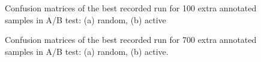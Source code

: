 \begin{figure}[ht!]
    \centering  
    \caption{Confusion matrices of the best recorded run for 100 extra annotated samples in A/B test: (a) random, (b) active}
    \label{c5:figure_cm_100}
\end{figure}

\begin{figure}[ht!]
    \centering  
    \caption{Confusion matrices of the best recorded run for 700 extra annotated samples in A/B test: (a) random, (b) active.}
    \label{c5:figure_cm_700}
\end{figure}

